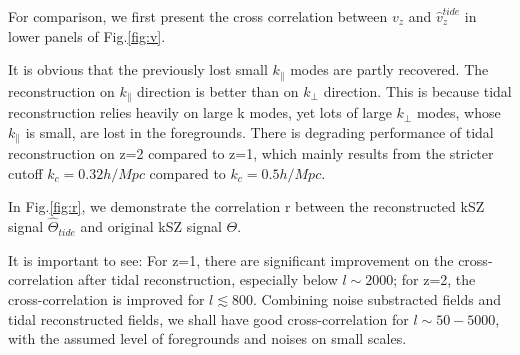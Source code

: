 
For comparison, we first present the cross correlation between $v_z$ and $\hat v_z^{tide}$ in lower panels of Fig.\ref{fig:v}. 

It is obvious that the previously lost small $k_\parallel$ modes are partly recovered. 
The reconstruction on $k_\parallel$ direction is better than on $k_\perp$ direction.
This is because tidal reconstruction relies heavily on large k modes, 
yet lots of large $k_\perp$ modes, whose $k_\parallel$ is small, are lost in the foregrounds. 
There is degrading performance of tidal reconstruction on z=2 compared to z=1, 
which mainly results from the stricter cutoff $k_c=0.32 h/Mpc$ compared to $k_c=0.5 h/Mpc$.

In Fig.\ref{fig:r}, 
we demonstrate the correlation r between the reconstructed kSZ signal $\hat \Theta_{tide}$ and original kSZ signal $\Theta$. 

It is important to see:
For z=1, there are significant improvement on the cross-correlation after tidal reconstruction, especially below $l\sim 2000$; 
for z=2, the cross-correlation is improved for $l\lesssim 800$. 
Combining noise substracted fields and tidal reconstructed fields, we shall have good cross-correlation for $l \sim 50-5000$, 
with the assumed level of foregrounds and noises on small scales.


